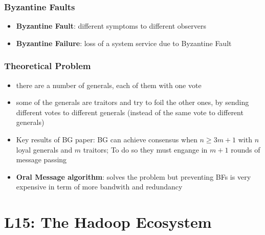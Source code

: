 \documentclass[a4paper]{article}
\begin{document}
\begin{multicols}{3}
\subsubsection{Byzantine Faults}
\begin{itemize}
    \item \textbf{Byzantine Fault}: different symptoms to different observers
    \item \textbf{Byzantine Failure}: loss of a system service due to Byzantine Fault
\end{itemize}

\subsubsection{Theoretical Problem}
\begin{itemize}
    \item there are a number of generals, each of them with one vote
    \item some of the generals are traitors and try to foil the other ones, by sending different votes to different generals (instead of the same vote to different generals)
    \item Key results of BG paper: BG can achieve consensus when $n\geq3m+1$ with $n$ loyal generals and $m$ traitors; To do so they must engange in $m+1$ rounds of message passing
    \item \textbf{Oral Message algorithm}: solves the problem but preventing BFs is very expensive in term of more bandwith and redundancy
\end{itemize}

\section{L15: The Hadoop Ecosystem}


\end{multicols}
\end{document}
